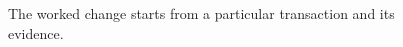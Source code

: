 \begin{figure}[H]
\centering
{}
\caption{The worked change starts from a particular transaction and its evidence.}\label{fig:teach-P-01b-complete-dry-run-01}
\end{figure}
